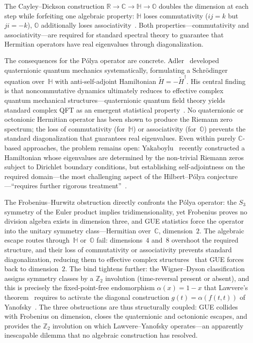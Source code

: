 The Cayley--Dickson construction
$\mathbb{R} \to \mathbb{C} \to \mathbb{H} \to \mathbb{O}$
doubles the dimension at each step while forfeiting one algebraic
property: $\mathbb{H}$ loses commutativity ($ij = k$ but $ji = -k$),
$\mathbb{O}$ additionally loses
associativity~\cite[\S~2.2]{baez02}.  Both properties---commutativity
and associativity---are required for standard spectral theory to
guarantee that Hermitian operators have real eigenvalues through
diagonalization.

The consequences for the P\'olya operator are concrete.
Adler~\cite{adler1996quaternionic} developed quaternionic quantum mechanics
systematically, formulating a Schr\"odinger equation over~$\mathbb{H}$
with anti-self-adjoint Hamiltonian $\tilde{H} = -\tilde{H}^\dagger$.
His central finding is that noncommutative dynamics ultimately reduces
to effective complex quantum mechanical structures---quaternionic
quantum field theory yields standard complex QFT as an emergent
statistical property~\cite{adler1996quaternionic}.  No quaternionic or octonionic
Hermitian operator has been shown to produce the Riemann zero
spectrum; the loss of commutativity (for~$\mathbb{H}$) or
associativity (for~$\mathbb{O}$) prevents the standard
diagonalization that guarantees real eigenvalues.  Even within purely
$\mathbb{C}$-based approaches, the problem remains open:
Yakaboylu~\cite{yakaboylu24} recently constructed a Hamiltonian whose
eigenvalues are determined by the non-trivial Riemann zeros subject to
Dirichlet boundary conditions, but establishing self-adjointness on
the required domain---the most challenging aspect of the
Hilbert--P\'olya conjecture---``requires further rigorous
treatment''~\cite{yakaboylu24}.

The Frobenius--Hurwitz obstruction directly confronts the P\'olya
operator: the $S_3$ symmetry of the Euler product implies
tridimensionality, yet Frobenius proves no division algebra exists in
dimension three, and GUE statistics force the operator into the
unitary symmetry class---Hermitian over~$\mathbb{C}$,
dimension~$2$.  The algebraic escape routes
through~$\mathbb{H}$ or~$\mathbb{O}$ fail: dimensions~$4$ and~$8$
overshoot the required structure, and their loss of commutativity or
associativity prevents standard diagonalization, reducing them to
effective complex structures~\cite{adler1996quaternionic,baez02} that GUE forces
back to dimension~$2$.  The bind tightens further: the Wigner--Dyson
classification assigns symmetry classes by a $\mathbb{Z}_2$ involution
(time-reversal present or absent), and this is precisely the
fixed-point-free endomorphism $\alpha(x)=1-x$ that Lawvere's
theorem~\cite{lawvere69} requires to activate the diagonal
construction $g(t)=\alpha(f(t,t))$ of Yanofsky~\cite{yanofsky03}.
The three obstructions are thus structurally coupled: GUE collides
with Frobenius on dimension, closes the quaternionic and octonionic
escapes, and provides the $\mathbb{Z}_2$ involution on which
Lawvere--Yanofsky operates---an apparently inescapable dilemma
that no algebraic construction has resolved.

